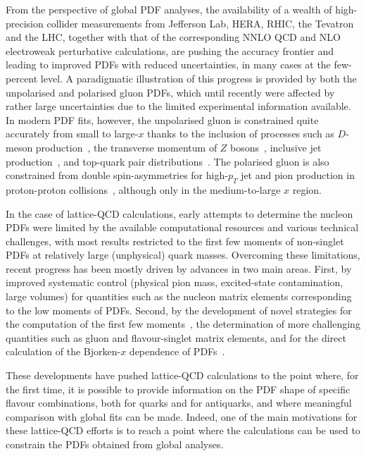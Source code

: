 From the perspective of global PDF analyses, the availability of a wealth of 
high-precision collider measurements from Jefferson Lab, HERA, RHIC, 
the Tevatron and the LHC, together with that of the corresponding
NNLO QCD and NLO electroweak perturbative calculations, are pushing the
accuracy frontier and leading to improved PDFs with reduced uncertainties,
in many cases at the few-percent level.
%
A paradigmatic illustration of this progress is provided by both the 
unpolarised and polarised gluon PDFs, which
until recently were affected by rather 
large uncertainties due to the limited experimental information
available.
%
In modern PDF fits, however, the unpolarised gluon is constrained quite 
accurately from small to large-$x$ thanks to the inclusion of processes such as $D$-meson
production~\cite{Zenaiev:2015rfa,Gauld:2016kpd},
the transverse momentum of $Z$ bosons~\cite{Boughezal:2017nla},
inclusive jet production~\cite{Currie:2016bfm}, and top-quark pair
distributions~\cite{Czakon:2016olj,Guzzi:2014wia}.
%
The polarised gluon is also constrained from double spin-asymmetries for 
high-$p_T$ jet and pion production in proton-proton 
collisions~\cite{deFlorian:2014yva,Nocera:2014gqa}, 
although only in the medium-to-large $x$ region.

In the case of lattice-QCD calculations, early attempts to determine
the nucleon PDFs were 
limited by the available computational resources and various technical 
challenges, with most results restricted to
the first few moments of non-singlet PDFs at relatively large (unphysical) quark masses.
%
Overcoming these limitations, recent progress has been mostly
driven by advances in two main areas. 
%
First, by improved systematic control (physical pion mass, excited-state 
contamination, large volumes) for quantities such as the nucleon matrix 
elements corresponding to the low moments of PDFs.
%
Second, by the  development of novel strategies
for the computation of the first few 
moments~\cite{Constantinou:2014tga,Syritsyn:2014saa,Lin:2012ev},
the determination of more challenging quantities 
such as gluon and flavour-singlet matrix elements, and
for the direct calculation of the 
Bjorken-$x$ dependence of PDFs~\cite{Lin:2014zya,Alexandrou:2015rja,
Chen:2016utp,Alexandrou:2016jqi}.

These developments have pushed lattice-QCD calculations to the point where, 
for the first time, it is possible to provide information on the PDF shape
of specific flavour combinations, both for quarks and for antiquarks, 
and where meaningful comparison with global fits can be made.
%
Indeed, one of the main motivations for these lattice-QCD efforts is to reach a point where 
the calculations can be used to constrain the PDFs obtained from global analyses.

